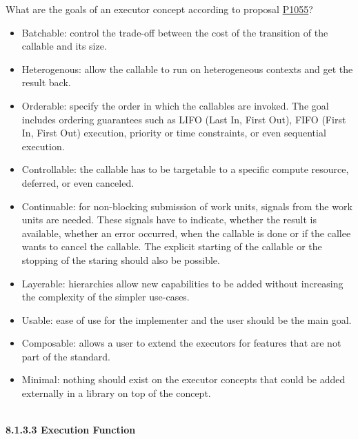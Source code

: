 What are the goals of an executor concept according to proposal \href{http://open-std.org/JTC1/SC22/WG21/docs/papers/2018/p1055r0.pdf}{P1055}?

\begin{itemize}
\item 
Batchable: control the trade-off between the cost of the transition of the callable and its size.

\item 
Heterogenous: allow the callable to run on heterogeneous contexts and get the result back.

\item 
Orderable: specify the order in which the callables are invoked. The goal includes ordering guarantees such as LIFO (Last In, First Out), FIFO (First In, First Out) execution, priority or time constraints, or even sequential execution.

\item 
Controllable: the callable has to be targetable to a specific compute resource, deferred, or even canceled.

\item 
Continuable: for non-blocking submission of work units, signals from the work units are needed. These signals have to indicate, whether the result is available, whether an error occurred, when the callable is done or if the callee wants to cancel the callable. The explicit starting of the callable or the stopping of the staring should also be possible.

\item 
Layerable: hierarchies allow new capabilities to be added without increasing the complexity of the simpler use-cases.

\item 
Usable: ease of use for the implementer and the user should be the main goal.
 
\item 
Composable: allows a user to extend the executors for features that are not part of the standard.

\item 
Minimal: nothing should exist on the executor concepts that could be added externally in a library on top of the concept.
\end{itemize}

\hspace*{\fill} \\ %
\noindent
\textbf{8.1.3.3\hspace{0.2cm} Execution Function}

